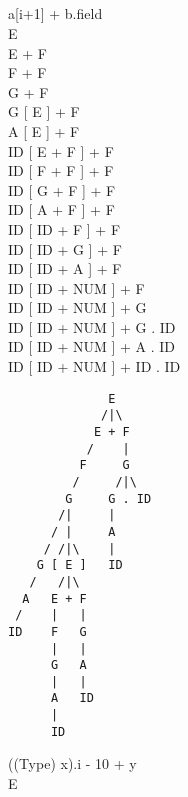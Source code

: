 \subsection{}
a{[}i+1{]} + b.field \\
E \\
E + F \\
F + F \\
G + F \\
G {[} E {]} + F \\
A {[} E {]} + F \\
ID {[} E + F {]} + F \\
ID {[} F + F {]} + F \\
ID {[} G + F {]} + F \\
ID {[} A + F {]} + F \\
ID {[} ID + F {]} + F \\
ID {[} ID + G {]} + F \\
ID {[} ID + A {]} + F \\
ID {[} ID + NUM {]} + F \\
ID {[} ID + NUM {]} + G \\
ID {[} ID + NUM {]} + G . ID \\
ID {[} ID + NUM {]} + A . ID \\
ID {[} ID + NUM {]} + ID . ID

\begin{verbatim}
              E
             /|\
            E + F
           /    |
          F     G
         /     /|\
        G     G . ID
       /|     |
      / |     A
     / /|\    |
    G [ E ]   ID
   /   /|\
  A   E + F
 /    |   |
ID    F   G
      |   |
      G   A
      |   |
      A   ID
      |
      ID
\end{verbatim}

((Type) x).i - 10 + y \\
E \\


